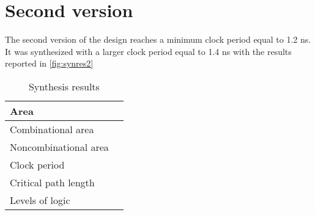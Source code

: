 \section{Second version}
The second version of the design reaches a minimum clock period equal to 1.2 ns. It was synthesized with a larger clock period equal to 1.4 ns with the results reported in \autoref{fig:synres2}
\begin{table}[h]
	\centering
	\begin{tabular}{|l|l|}
		\hline
		Area & \\\hline
		Combinational area &  \\\hline
		Noncombinational area &\\\hline
		Clock period &  \\\hline
		Critical path length & \\\hline
		Levels of logic & \\\hline
		
	\end{tabular}
	\caption{Synthesis results}
	\label{tab:synres2}
\end{table}


